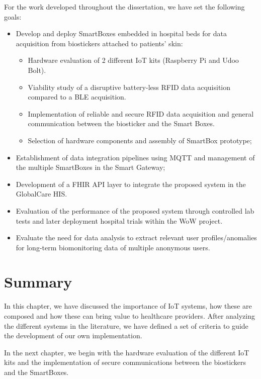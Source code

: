 
For the work developed throughout the dissertation, we have set the following goals: 

\begin{itemize}
    \item Develop and deploy SmartBoxes embedded in hospital beds for data acquisition from biostickers attached to patients’ skin:
    \begin{itemize}
        \item Hardware evaluation of 2 different \acs{IoT} kits (Raspberry Pi and Udoo Bolt).
        \item Viability study of a disruptive battery-less \acs{RFID} data acquisition compared to a \acs{BLE} acquisition.
        \item Implementation of reliable and secure \acs{RFID} data acquisition and general communication between the biosticker and the Smart Boxes.
        \item Selection of hardware components and assembly of SmartBox prototype;
    \end{itemize}
    \item Establishment of data integration pipelines using \acs{MQTT} and management of the multiple SmartBoxes in the Smart Gateway;
    \item Development of a \acs{FHIR} \acs{API} layer to integrate the proposed system in the GlobalCare \acs{HIS}.
    \item Evaluation of the performance of the proposed system through controlled lab tests and later deployment hospital trials within the WoW project.
    \item Evaluate the need for data analysis to extract relevant user profiles/anomalies for long-term biomonitoring data of multiple anonymous users.
\end{itemize}

\section{Summary}
In this chapter, we have discussed the importance of \acs{IoT} systems, how these are composed and how these can bring value to healthcare providers. After analyzing the different systems in the literature, we have defined a set of criteria to guide the development of our own implementation.

\bigskip

In the next chapter, we begin with the hardware evaluation of the different \acs{IoT} kits and the implementation of secure communications between the biostickers and the SmartBoxes. 

